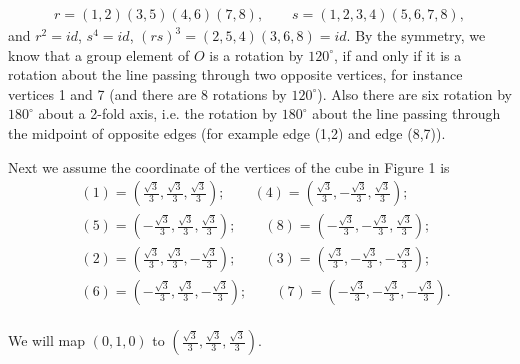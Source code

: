 \documentclass{amsart}
\begin{document}
\begin{align*}
r = (1,2)(3,5)(4,6)(7,8), \qquad s = (1,2,3,4)(5,6,7,8),
\end{align*}
and $r^2 = id$, $s^4 = id$, $(rs)^3 = (2,5,4)(3,6,8) = id$. By the symmetry, we know that
a group element of $O$ is a rotation by $120^\circ$, if and only if it is a rotation about
the line passing through two opposite vertices, for instance vertices 1 and 7 (and there are
8 rotations by $120^\circ$). Also there are six rotation by $180^\circ$ about a 2-fold axis,
i.e. the rotation by $180^\circ$ about the line passing through the midpoint of opposite edges
(for example edge (1,2) and edge (8,7)).

Next we assume the coordinate of the vertices of the cube in Figure 1 is
\begin{align*}
&(1) = (\frac{\sqrt{3}}{3},\frac{\sqrt{3}}{3}, \frac{\sqrt{3}}{3}); \qquad (4) = (\frac{\sqrt{3}}{3},-\frac{\sqrt{3}}{3}, \frac{\sqrt{3}}{3});\\
&(5) = (-\frac{\sqrt{3}}{3},\frac{\sqrt{3}}{3}, \frac{\sqrt{3}}{3}); \qquad (8) = (-\frac{\sqrt{3}}{3},-\frac{\sqrt{3}}{3}, \frac{\sqrt{3}}{3});\\
&(2) = (\frac{\sqrt{3}}{3},\frac{\sqrt{3}}{3}, -\frac{\sqrt{3}}{3}); \qquad (3) = (\frac{\sqrt{3}}{3},-\frac{\sqrt{3}}{3}, -\frac{\sqrt{3}}{3});\\
&(6) = (-\frac{\sqrt{3}}{3},\frac{\sqrt{3}}{3}, -\frac{\sqrt{3}}{3}); \qquad (7) = (-\frac{\sqrt{3}}{3},-\frac{\sqrt{3}}{3}, -\frac{\sqrt{3}}{3}).\\
\end{align*}

We will map $(0,1,0)$ to $(\frac{\sqrt{3}}{3},\frac{\sqrt{3}}{3}, \frac{\sqrt{3}}{3})$.
\end{document}
